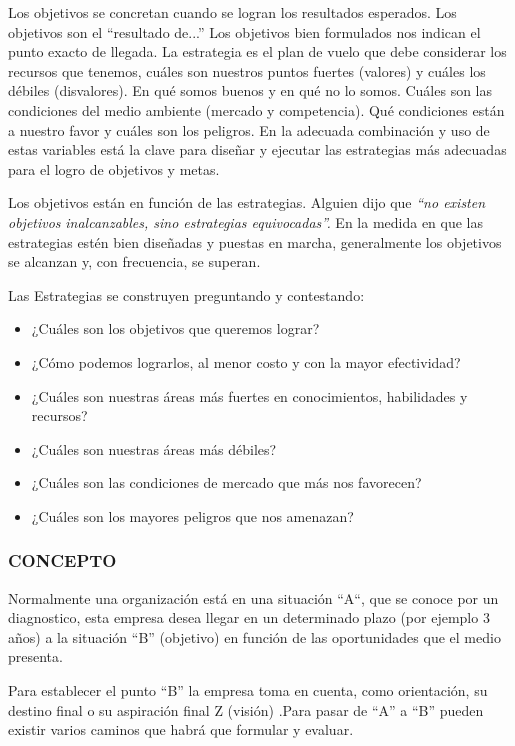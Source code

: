 Los objetivos se concretan cuando se logran los resultados esperados. Los objetivos son el “resultado de...” Los objetivos bien formulados nos indican el punto exacto de llegada. La estrategia es el plan de vuelo que debe considerar los recursos que tenemos, cuáles son nuestros puntos fuertes (valores) y cuáles los débiles (disvalores). En qué somos buenos y en qué no lo somos. Cuáles son las condiciones del medio ambiente (mercado y competencia). Qué condiciones están a nuestro favor y cuáles son los peligros. En la adecuada combinación y uso de estas variables está la clave para diseñar y ejecutar las estrategias más adecuadas para el logro de objetivos y metas.

Los objetivos están en función de las estrategias. Alguien dijo que \textit{“no existen objetivos} \textit{inalcanzables, sino estrategias equivocadas”. }En la medida en que las estrategias estén bien diseñadas y puestas en marcha, generalmente los objetivos se alcanzan y, con frecuencia, se superan.

Las Estrategias se construyen preguntando y contestando:

\begin{itemize}
  \item ¿Cuáles son los objetivos que queremos lograr?
  \item ¿Cómo podemos lograrlos, al menor costo y con la mayor efectividad?
  \item ¿Cuáles son nuestras áreas más fuertes en conocimientos, habilidades y recursos?
  \item ¿Cuáles son nuestras áreas más débiles?
  \item ¿Cuáles son las condiciones de mercado que más nos favorecen?
  \item ¿Cuáles son los mayores peligros que nos amenazan?
\end{itemize}


\subsubsection*{CONCEPTO}
Normalmente una organización está en una situación “A“, que se conoce por un diagnostico, esta empresa desea llegar en un determinado plazo (por ejemplo 3 años) a la situación “B” (objetivo) en función de las oportunidades que el medio presenta.

Para establecer el punto “B” la empresa toma en cuenta, como orientación, su destino final o su aspiración final Z (visión) .Para pasar de “A” a “B” pueden existir varios caminos que habrá que formular y evaluar.


